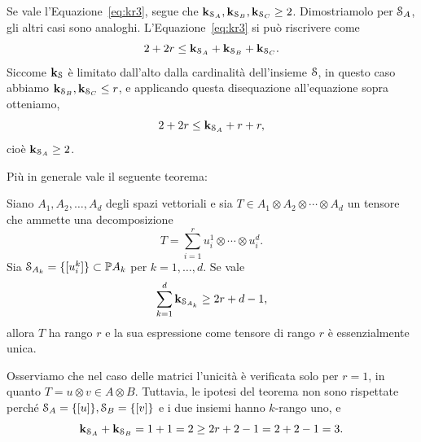 \begin{remark}
	\label{rm:stima_krk}
	Se vale l'Equazione~\eqref{eq:kr3}, segue che $ \mathbf{k}_{\mathcal{S}_A},\mathbf{k}_{\mathcal{S}_B}, \mathbf{k}_{\mathcal{S}_C} \ge 2
	$. Dimostriamolo per $ \mathcal{S}_{A} $, gli altri casi sono analoghi. L'Equazione~\eqref{eq:kr3} si può riscrivere come
	\begin{equation*}
		2 + 2r \le \mathbf{k}_{\mathcal{S}_{A}} + \mathbf{k}_{\mathcal{S}_B} + \mathbf{k}_{\mathcal{S}_C}.
	\end{equation*}
	Siccome $ \mathbf{k}_{\mathcal{S}} $ è limitato dall'alto dalla cardinalità dell'insieme $ \mathcal{S} $, in questo caso
	abbiamo $ \mathbf{k}_{\mathcal{S}_B},\mathbf{k}_{\mathcal{S}_C} \le r $, e applicando questa disequazione all'equazione sopra otteniamo,
	\begin{equation*}
		2 + 2r \le \mathbf{k}_{\mathcal{S}_{A}} + r + r,
	\end{equation*}
	cioè $ \mathbf{k}_{\mathcal{S}_A} \ge 2 $.
\end{remark}



Più in generale vale il seguente teorema:
\begin{theorem}
	Siano $A_1, A_2, \ldots, A_{d} $ degli spazi vettoriali e sia $ T \in A_1\otimes A_2 \otimes
		\cdots \otimes A_d $ un tensore che ammette una decomposizione
	\begin{equation*}
		T= \sum_{i=1}^r u^1_{i} \otimes \cdots \otimes u^d_{i}.
	\end{equation*}
	Sia $ \mathcal{S}_{A_k} = \{[u^k_{i}]\} \subset \mathbb{P} A_{k} $ per $ k = 1, \ldots, d $. Se
	vale
	\begin{equation}
		\sum_{k=1}^d \mathbf{k}_{\mathcal{S}_{A_k}} \ge 2r + d - 1,
	\end{equation}
	allora $ T $ ha rango $ r $ e la sua espressione come tensore di rango $ r $ è essenzialmente unica.
\end{theorem}

\begin{remark}
	Osserviamo che nel caso delle matrici l'unicità è verificata solo per $ r = 1 $, in quanto $ T = u
		\otimes v \in A \otimes B $. Tuttavia, le ipotesi del teorema non sono rispettate perché $ \mathcal{S}_{A} =
		\{[u]\}, \mathcal{S}_{B} = \{[v]\}  $ e i due insiemi hanno $ k $-rango uno, e
	\begin{equation*}
		\mathbf{k}_{\mathcal{S}_{A}} + \mathbf{k}_{\mathcal{S}_{B}} = 1 + 1 = 2 \ge 2r + 2 - 1 = 2 + 2 - 1 = 3.
	\end{equation*}
\end{remark}




